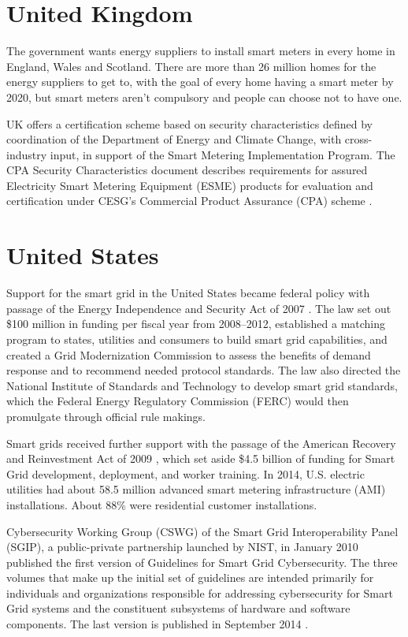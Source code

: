 \section{United Kingdom}
The government wants energy suppliers to install smart meters in every home in England, Wales and Scotland. There are more than 26 million homes for the energy suppliers to get to, with the goal of every home having a smart meter by 2020, but smart meters aren’t compulsory and people can choose not to have one.\par
UK offers a certification scheme based on security characteristics defined by coordination of the Department of Energy and Climate Change, with cross-industry input, in support of the Smart Metering Implementation Program. The CPA Security Characteristics document \citep{uk1} describes requirements for assured Electricity Smart Metering Equipment (ESME) products for evaluation and certification under CESG’s Commercial Product Assurance (CPA) scheme \citep{uk2}.

\section{United States}
Support for the smart grid in the United States became federal policy with passage of the Energy Independence and Security Act of 2007 \citep{us1}. The law set out \$100 million in funding per fiscal year from 2008–2012, established a matching program to states, utilities and consumers to build smart grid capabilities, and created a Grid Modernization Commission to assess the benefits of demand response and to recommend needed protocol standards. The law also directed the National Institute of Standards and Technology to develop smart grid standards, which the Federal Energy Regulatory Commission (FERC) would then promulgate through official rule makings.\par
Smart grids received further support with the passage of the American Recovery and Reinvestment Act of 2009 \citep{us2}, which set aside \$4.5 billion of funding for Smart Grid development, deployment, and worker training. In 2014, U.S. electric utilities had about 58.5 million advanced smart metering infrastructure (AMI) installations. About 88\% were residential customer installations.\par
Cybersecurity Working Group (CSWG) of the Smart Grid Interoperability Panel (SGIP), a public-private partnership launched by NIST, in January 2010 published the first version of Guidelines for Smart Grid Cybersecurity. The three volumes that make up the initial set of guidelines are intended primarily for individuals and organizations responsible for addressing cybersecurity for Smart Grid systems and the constituent subsystems of hardware and software components. The last version is published in September 2014 \citep{us3}.